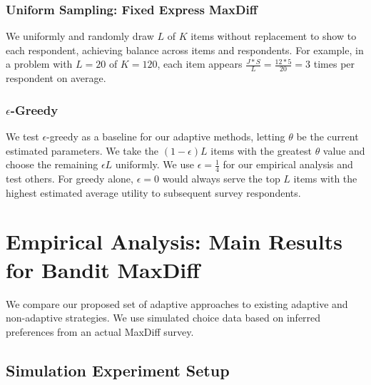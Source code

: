 \documentclass[nonblindrev]{informs3}
\newcommand{\numperset}{L}
\begin{document}


\subsubsection{Uniform Sampling: Fixed Express MaxDiff}
We uniformly and randomly draw $\numperset$ of $K$ items without replacement to show to each respondent, achieving balance across items and respondents. For example, in a problem with $\numperset=20$ of $K=120$, each item appears $\frac{J*S}{L} = \frac{12*5}{20} = 3$ times per respondent on average.

\subsubsection{$\epsilon$-Greedy}
We test $\epsilon$-greedy as a baseline for our adaptive methods, letting $\theta$ be the current estimated parameters. We take the $(1-\epsilon)L$ items with the greatest $\theta$ value and choose the remaining $\epsilon L$ uniformly. We use $\epsilon=\frac{1}{4}$ for our empirical analysis and test others. For greedy alone, $\epsilon=0$ would always serve the top $\numperset$ items with the highest estimated average utility to subsequent survey respondents.






\section{Empirical Analysis: Main Results for Bandit MaxDiff}

\label{sec:empirical_main}
We compare our proposed set of adaptive approaches to existing adaptive and non-adaptive strategies. We use simulated choice data based on inferred preferences from an actual MaxDiff survey.

\subsection{Simulation Experiment Setup}
\end{document}
